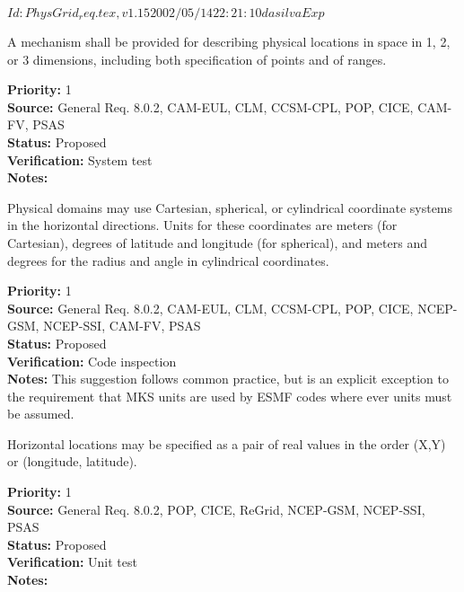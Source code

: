 $Id: PhysGrid_req.tex,v 1.15 2002/05/14 22:21:10 dasilva Exp $


A mechanism shall be provided for describing physical locations in space in 1,
2, or 3 dimensions, including both specification of points and of ranges.
\begin{reqlist}
{\bf Priority:} 1 \\
{\bf Source:} General Req. 8.0.2, CAM-EUL, CLM, CCSM-CPL, POP, CICE, 
              CAM-FV, PSAS \\
{\bf Status:} Proposed \\
{\bf Verification:} System test\\
{\bf Notes:} 
\end{reqlist}



Physical domains may use Cartesian, spherical, or cylindrical coordinate
systems in the horizontal directions.  Units for these coordinates are meters
(for Cartesian), degrees of latitude and longitude (for spherical), and meters
and degrees for the radius and angle in cylindrical coordinates.

\begin{reqlist}
{\bf Priority:} 1 \\
{\bf Source:} General Req. 8.0.2, CAM-EUL, CLM, CCSM-CPL, POP, CICE, NCEP-GSM, NCEP-SSI, CAM-FV, PSAS \\
{\bf Status:} Proposed \\
{\bf Verification:} Code inspection\\
{\bf Notes:}  This suggestion follows common practice, but is an explicit
exception to the requirement that MKS units are used by ESMF codes where ever
units must be assumed.
\end{reqlist}


   Horizontal locations may be specified as a pair of real values in the order
(X,Y) or (longitude, latitude).
\begin{reqlist}
{\bf Priority:} 1 \\
{\bf Source:} General Req. 8.0.2, POP, CICE, ReGrid, NCEP-GSM, NCEP-SSI,
              PSAS \\
{\bf Status:} Proposed \\
{\bf Verification:} Unit test\\
{\bf Notes:} 
\end{reqlist}


